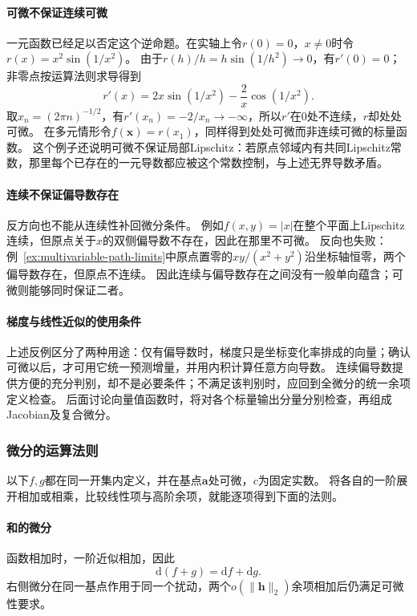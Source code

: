 \paragraph{可微不保证连续可微}
一元函数已经足以否定这个逆命题。在实轴上令$r(0)=0$，$x\neq0$时令$r(x)=x^2\sin(1/x^2)$。
由于$r(h)/h=h\sin(1/h^2)\to0$，有$r'(0)=0$；非零点按运算法则求导得到
\[
 r'(x)=2x\sin(1/x^2)-\frac{2}{x}\cos(1/x^2).
\]
取$x_n=(2\pi n)^{-1/2}$，有$r'(x_n)=-2/x_n\to-\infty$，所以$r'$在$0$处不连续，$r$却处处可微。
在多元情形令$f(\bm x)=r(x_1)$，同样得到处处可微而非连续可微的标量函数。
这个例子还说明可微不保证局部Lipschitz：若原点邻域内有共同Lipschitz常数，那里每个已存在的一元导数都应被这个常数控制，与上述无界导数矛盾。

\paragraph{连续不保证偏导数存在}
反方向也不能从连续性补回微分条件。
例如$f(x,y)=|x|$在整个平面上Lipschitz连续，但原点关于$x$的双侧偏导数不存在，因此在那里不可微。
反向也失败：例~\ref{ex:multivariable-path-limits}中原点置零的$xy/(x^2+y^2)$沿坐标轴恒零，两个偏导数存在，但原点不连续。
因此连续与偏导数存在之间没有一般单向蕴含；可微则能够同时保证二者。

\paragraph{梯度与线性近似的使用条件}
上述反例区分了两种用途：仅有偏导数时，梯度只是坐标变化率排成的向量；确认可微以后，才可用它统一预测增量，并用内积计算任意方向导数。
连续偏导数提供方便的充分判别，却不是必要条件；不满足该判别时，应回到全微分的统一余项定义检查。
后面讨论向量值函数时，将对各个标量输出分量分别检查，再组成Jacobian及复合微分。

\subsubsection{微分的运算法则}

以下$f,g$都在同一开集内定义，并在基点$\bm a$处可微，$c$为固定实数。
将各自的一阶展开相加或相乘，比较线性项与高阶余项，就能逐项得到下面的法则。

\paragraph{和的微分}
函数相加时，一阶近似相加，因此
\[
 \mathrm d(f+g)=\mathrm df+\mathrm dg.
\]
右侧微分在同一基点作用于同一个扰动，两个$o(\lVert\bm h\rVert_2)$余项相加后仍满足可微性要求。

